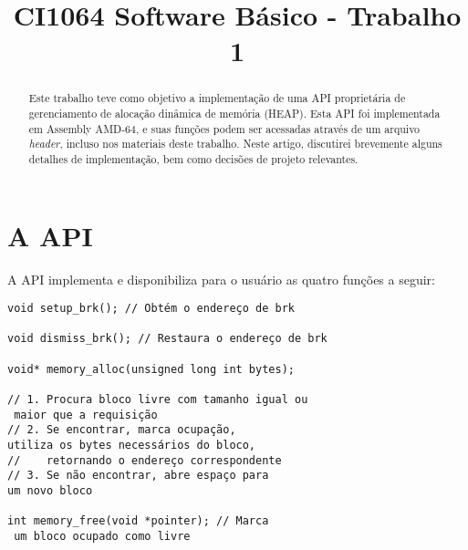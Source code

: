 \documentclass[conference]{IEEEtran}
\begin{document}
\begin{acronym}[TDMA]
\end{acronym}

\newlength\figureheight
\newlength\figurewidth


\title{CI1064 Software Básico - Trabalho 1}

\author{
}

\maketitle

\begin{abstract}
Este trabalho teve como objetivo a implementação de uma API proprietária de gerenciamento de alocação dinâmica de memória (HEAP). Esta API foi implementada em Assembly AMD-64, e suas funções podem ser acessadas através de um arquivo \textit{header}, incluso nos materiais deste trabalho. Neste artigo, discutirei brevemente alguns detalhes de implementação, bem como decisões de projeto relevantes.
\end{abstract}

\section{A API}
A API implementa e disponibiliza para o usuário as quatro funções a seguir:

\begin{verbatim}
void setup_brk(); // Obtém o endereço de brk

void dismiss_brk(); // Restaura o endereço de brk

void* memory_alloc(unsigned long int bytes);

// 1. Procura bloco livre com tamanho igual ou
 maior que a requisição
// 2. Se encontrar, marca ocupação, 
utiliza os bytes necessários do bloco, 
//    retornando o endereço correspondente
// 3. Se não encontrar, abre espaço para
um novo bloco

int memory_free(void *pointer); // Marca
 um bloco ocupado como livre
\end{verbatim}
\end{document}
